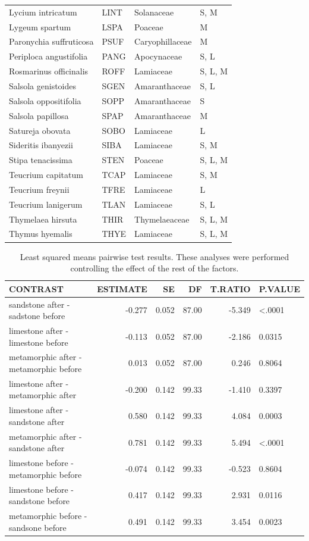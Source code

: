 \documentclass[11pt,twoside]{reedthesis}
\begin{document}
\begin{table}[H]
\begin{tabular}[t]{llll}
Lycium intricatum & LINT & Solanaceae & S, M\\
Lygeum spartum & LSPA & Poaceae & M\\
Paronychia suffruticosa & PSUF & Caryophillaceae & M\\
Periploca angustifolia & PANG & Apocynaceae & S, L\\
Rosmarinus officinalis & ROFF & Lamiaceae & S, L, M\\
Salsola genistoides & SGEN & Amaranthaceae & S, L\\
Salsola oppositifolia & SOPP & Amaranthaceae & S\\
Salsola papillosa & SPAP & Amaranthaceae & M\\
Satureja obovata & SOBO & Lamiaceae & L\\
Sideritis ibanyezii & SIBA & Lamiaceae & S, M\\
Stipa tenacissima & STEN & Poaceae & S, L, M\\
Teucrium capitatum & TCAP & Lamiaceae & S, M\\
Teucrium freynii & TFRE & Lamiaceae & L\\
Teucrium lanigerum & TLAN & Lamiaceae & S, L\\
Thymelaea hirsuta & THIR & Thymelaeaceae & S, L, M\\
Thymus hyemalis & THYE & Lamiaceae & S, L, M\\
\bottomrule
\end{tabular}
\end{table}
\begin{table}[H]

\caption[Least squared means pairwise test results]{\label{tab:unnamed-chunk-43}Least squared means pairwise test results. These analyses were performed controlling the effect of the rest of the factors. }
\centering
\fontsize{8}{10}\selectfont
\begin{tabular}[t]{lrrrrl}
\toprule
CONTRAST & ESTIMATE & SE & DF & T.RATIO & P.VALUE\\
\midrule
sandstone after - sadstone before & -0.277 & 0.052 & 87.00 & -5.349 & <.0001\\
limestone after - limestone before & -0.113 & 0.052 & 87.00 & -2.186 & 0.0315\\
metamorphic after - metamorphic before & 0.013 & 0.052 & 87.00 & 0.246 & 0.8064\\
limestone after - metamorphic after & -0.200 & 0.142 & 99.33 & -1.410 & 0.3397\\
limestone after - sandstone after & 0.580 & 0.142 & 99.33 & 4.084 & 0.0003\\
metamorphic after -sandstone after & 0.781 & 0.142 & 99.33 & 5.494 & <.0001\\
limestone before - metamorphic before & -0.074 & 0.142 & 99.33 & -0.523 & 0.8604\\
limestone before - sandstone before & 0.417 & 0.142 & 99.33 & 2.931 & 0.0116\\
metamorphic before -  sandsone  before & 0.491 & 0.142 & 99.33 & 3.454 & 0.0023\\
\bottomrule
\end{tabular}
\end{table}
\end{document}
